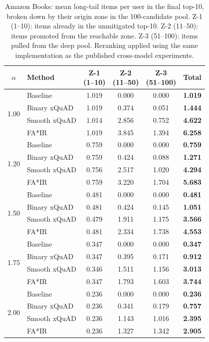 \begin{table}[htbp]
\centering
\caption{Amazon Books: mean long-tail items per user in the final top-10, broken down by their origin zone in the 100-candidate pool. Z-1 (1--10): items already in the unmitigated top-10. Z-2 (11--50): items promoted from the reachable zone. Z-3 (51--100): items pulled from the deep pool. Reranking applied using the same implementation as the published cross-model experiments.}
\label{tab:zone_migration_ab}
\begin{tabular}{clcccc}
\toprule
$\alpha$ & Method & \makecell{Z-1\\(1--10)} & \makecell{Z-2\\(11--50)} & \makecell{Z-3\\(51--100)} & Total \\
\midrule
\multirow{4}{*}{1.00}
 & Baseline & 1.019 & 0.000 & 0.000 & \textbf{1.019} \\
 \rowcolor{gray!6} & Binary xQuAD & 1.019 & 0.374 & 0.051 & \textbf{1.444} \\
 & Smooth xQuAD & 1.014 & 2.856 & 0.752 & \textbf{4.622} \\
 \rowcolor{gray!6} & FA*IR & 1.019 & 3.845 & 1.394 & \textbf{6.258} \\
\midrule
\multirow{4}{*}{1.20}
 & Baseline & 0.759 & 0.000 & 0.000 & \textbf{0.759} \\
 \rowcolor{gray!6} & Binary xQuAD & 0.759 & 0.424 & 0.088 & \textbf{1.271} \\
 & Smooth xQuAD & 0.756 & 2.517 & 1.020 & \textbf{4.294} \\
 \rowcolor{gray!6} & FA*IR & 0.759 & 3.220 & 1.704 & \textbf{5.683} \\
\midrule
\multirow{4}{*}{1.50}
 & Baseline & 0.481 & 0.000 & 0.000 & \textbf{0.481} \\
 \rowcolor{gray!6} & Binary xQuAD & 0.481 & 0.424 & 0.145 & \textbf{1.051} \\
 & Smooth xQuAD & 0.479 & 1.911 & 1.175 & \textbf{3.566} \\
 \rowcolor{gray!6} & FA*IR & 0.481 & 2.334 & 1.738 & \textbf{4.553} \\
\midrule
\multirow{4}{*}{1.75}
 & Baseline & 0.347 & 0.000 & 0.000 & \textbf{0.347} \\
 \rowcolor{gray!6} & Binary xQuAD & 0.347 & 0.395 & 0.171 & \textbf{0.912} \\
 & Smooth xQuAD & 0.346 & 1.511 & 1.156 & \textbf{3.013} \\
 \rowcolor{gray!6} & FA*IR & 0.347 & 1.793 & 1.603 & \textbf{3.744} \\
\midrule
\multirow{4}{*}{2.00}
 & Baseline & 0.236 & 0.000 & 0.000 & \textbf{0.236} \\
 \rowcolor{gray!6} & Binary xQuAD & 0.236 & 0.341 & 0.179 & \textbf{0.757} \\
 & Smooth xQuAD & 0.236 & 1.143 & 1.016 & \textbf{2.395} \\
 \rowcolor{gray!6} & FA*IR & 0.236 & 1.327 & 1.342 & \textbf{2.905} \\
\bottomrule
\end{tabular}
\end{table}